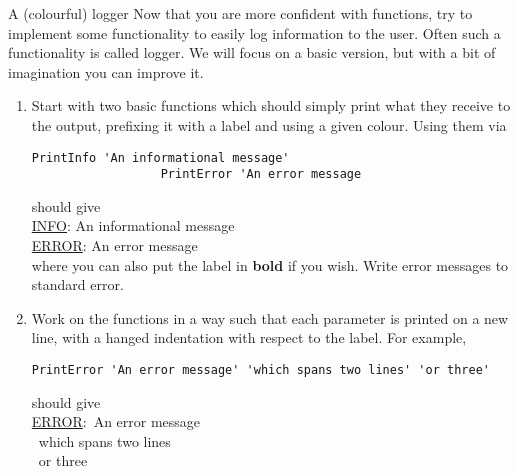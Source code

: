 
\begin{exercise}[Inspirational]{A (colourful) logger}
    Now that you are more confident with functions, try to implement some functionality to easily log information to the user.
    Often such a functionality is called logger.
    We will focus on a basic version, but with a bit of imagination you can improve it.
    \begin{enumerate}
        \item Start with two basic functions which should simply print what they receive to the output, prefixing it with a label and using a given colour.
              Using them via
              \begin{lstlisting}[style=MyBash]
                  PrintInfo 'An informational message'
                  PrintError 'An error message
              \end{lstlisting}
              should give\\[0.3ex]
              {
                \ttfamily
                \hspace*{5mm}\color{ForestGreen}\underline{INFO}: An informational message\\
                \hspace*{5mm}\color{red}\underline{ERROR}: An error message\\[0.5ex]
              }
              where you can also put the label in \textbf{bold} if you wish.
              Write error messages to standard error.
        \item Work on the functions in a way such that each parameter is printed on a new line, with a hanged indentation with respect to the label.
              For example, 
              \begin{lstlisting}[style=MyBash]
                  PrintError 'An error message' 'which spans two lines' 'or three'
              \end{lstlisting}
              should give\\[0.3ex]
              {
                \ttfamily\color{red}
                \hspace*{5mm}\underline{ERROR}:~An error message\\
                \hspace*{5mm}~which spans two lines\\
                \hspace*{5mm}~or three
}
\end{enumerate}
\end{exercise}
